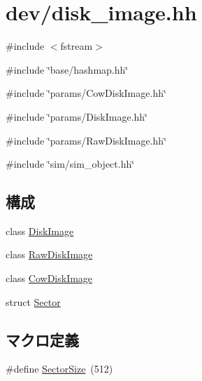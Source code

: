 \hypertarget{disk__image_8hh}{
\section{dev/disk\_\-image.hh}
\label{disk__image_8hh}
}
{\ttfamily \#include $<$fstream$>$}\par
{\ttfamily \#include \char`\"{}base/hashmap.hh\char`\"{}}\par
{\ttfamily \#include \char`\"{}params/CowDiskImage.hh\char`\"{}}\par
{\ttfamily \#include \char`\"{}params/DiskImage.hh\char`\"{}}\par
{\ttfamily \#include \char`\"{}params/RawDiskImage.hh\char`\"{}}\par
{\ttfamily \#include \char`\"{}sim/sim\_\-object.hh\char`\"{}}\par
\subsection*{構成}
\begin{DoxyCompactItemize}
\item 
class \hyperlink{classDiskImage}{DiskImage}
\item 
class \hyperlink{classRawDiskImage}{RawDiskImage}
\item 
class \hyperlink{classCowDiskImage}{CowDiskImage}
\item 
struct \hyperlink{structCowDiskImage_1_1Sector}{Sector}
\end{DoxyCompactItemize}
\subsection*{マクロ定義}
\begin{DoxyCompactItemize}
\item 
\#define \hyperlink{disk__image_8hh_ac729b32bca4535899ef2ee58b6a13d68}{SectorSize}~(512)
\end{DoxyCompactItemize}
